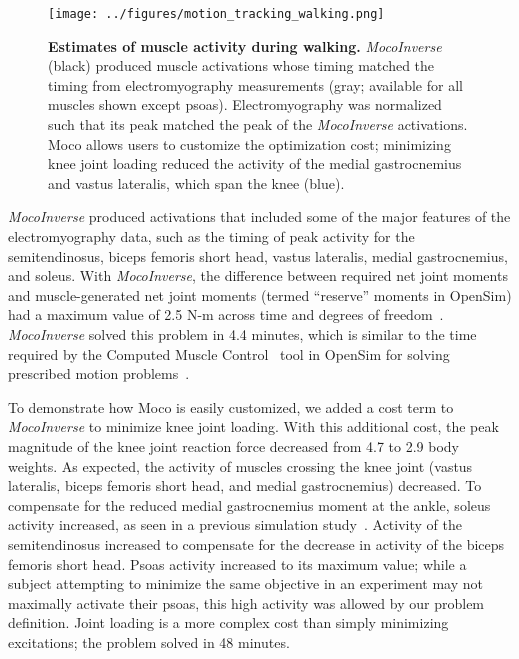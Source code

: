 \documentclass[10pt,letterpaper]{article}
\begin{document}
\begin{figure}[!h]
        \begin{adjustwidth}{-2.25in}{0in} %
    \centering
    \texttt{[image: ../figures/motion\_tracking\_walking.png]}
    \caption{{\bf Estimates of muscle activity during walking.}
    \textit{MocoInverse} (black) produced muscle activations whose timing matched the timing from electromyography measurements (gray; available for all muscles shown except psoas). Electromyography was normalized such that its peak matched the peak of the \textit{MocoInverse} activations. Moco allows users to customize the optimization cost; minimizing knee joint loading reduced the activity of the medial gastrocnemius and vastus lateralis, which span the knee (blue).
    }
    \label{walking}
        \end{adjustwidth}
\end{figure}

\textit{MocoInverse} produced activations that included some of the major features of the electromyography data, such as the timing of peak activity for the semitendinosus, biceps femoris short head, vastus lateralis, medial gastrocnemius, and soleus. With \textit{MocoInverse}, the difference between required net joint moments and muscle-generated net joint moments (termed “reserve” moments in OpenSim) had a maximum value of 2.5 N-m across time and degrees of freedom~\cite{Hicks:2015bo}. \textit{MocoInverse} solved this problem in 4.4 minutes, which is similar to the time required by the Computed Muscle Control~\cite{Thelen:2003bba} tool in OpenSim for solving prescribed motion problems~\cite{Rajagopal:2016ek}.

To demonstrate how Moco is easily customized, we added a cost term to \textit{MocoInverse} to minimize knee joint loading. With this additional cost, the peak magnitude of the knee joint reaction force decreased from 4.7 to 2.9 body weights. As expected, the activity of muscles crossing the knee joint (vastus lateralis, biceps femoris short head, and medial gastrocnemius) decreased. To compensate for the reduced medial gastrocnemius moment at the ankle, soleus activity increased, as seen in a previous simulation study~\cite{DeMers:2014}. Activity of the semitendinosus increased to compensate for the decrease in activity of the biceps femoris short head. Psoas activity increased to its maximum value; while a subject attempting to minimize the same objective in an experiment may not maximally activate their psoas, this high activity was allowed by our problem definition. Joint loading is a more complex cost than simply minimizing excitations; the problem solved in 48 minutes.
\end{document}
